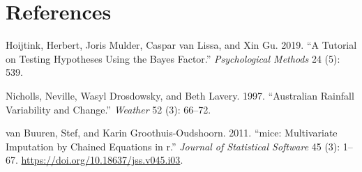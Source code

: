 \documentclass[
]{article}
\newlength{\cslhangindent}
\newlength{\cslentryspacingunit} %
\newenvironment{CSLReferences}[2] %
 {%
  \setlength{\parindent}{0pt}
  \ifodd #1
  \let\oldpar\par
  \def\par{\hangindent=\cslhangindent\oldpar}
  \fi
  \setlength{\parskip}{#2\cslentryspacingunit}
 }%
 {}
\begin{document}
\hypertarget{references}{%
\section*{References}\label{references}}

\hypertarget{refs}{}
\begin{CSLReferences}{1}{0}
\leavevmode{}%
Hoijtink, Herbert, Joris Mulder, Caspar van Lissa, and Xin Gu. 2019.
{``A Tutorial on Testing Hypotheses Using the Bayes Factor.''}
\emph{Psychological Methods} 24 (5): 539.

\leavevmode{}%
Nicholls, Neville, Wasyl Drosdowsky, and Beth Lavery. 1997.
{``Australian Rainfall Variability and Change.''} \emph{Weather} 52 (3):
66--72.

\leavevmode{}%
van Buuren, Stef, and Karin Groothuis-Oudshoorn. 2011. {``{mice}:
Multivariate Imputation by Chained Equations in r.''} \emph{Journal of
Statistical Software} 45 (3): 1--67.
\url{https://doi.org/10.18637/jss.v045.i03}.

\end{CSLReferences}
\end{document}
